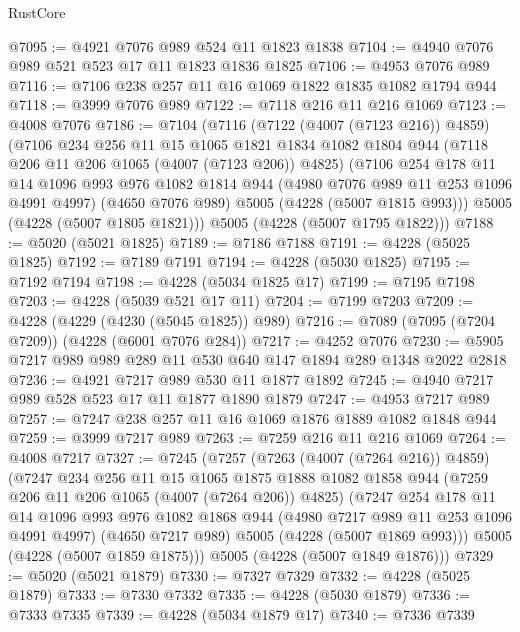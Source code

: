 \begin{lexlean}{RustCore}
\begin{coremodule}
@7095 := @4921 @7076 @989 @524 @11 @1823 @1838
@7104 := @4940 @7076 @989 @521 @523 @17 @11 @1823 @1836 @1825
@7106 := @4953 @7076 @989
@7116 := @7106 @238 @257 @11 @16 @1069 @1822 @1835 @1082 @1794 @944
@7118 := @3999 @7076 @989
@7122 := @7118 @216 @11 @216 @1069
@7123 := @4008 @7076
@7186 := @7104
    (@7116
      (@7122 (@4007 (@7123 @216)) @4859)
      (@7106
        @234
        @256
        @11
        @15
        @1065
        @1821
        @1834
        @1082
        @1804
        @944
        (@7118 @206 @11 @206 @1065 (@4007 (@7123 @206)) @4825)
        (@7106
          @254
          @178
          @11
          @14
          @1096
          @993
          @976
          @1082
          @1814
          @944
          (@4980 @7076 @989 @11 @253 @1096 @4991 @4997)
          (@4650 @7076 @989)
          @5005
          (@4228 (@5007 @1815 @993)))
        @5005
        (@4228 (@5007 @1805 @1821)))
      @5005
      (@4228 (@5007 @1795 @1822)))
@7188 := @5020 (@5021 @1825)
@7189 := @7186 @7188
@7191 := @4228 (@5025 @1825)
@7192 := @7189 @7191
@7194 := @4228 (@5030 @1825)
@7195 := @7192 @7194
@7198 := @4228 (@5034 @1825 @17)
@7199 := @7195 @7198
@7203 := @4228 (@5039 @521 @17 @11)
@7204 := @7199 @7203
@7209 := @4228 (@4229 (@4230 (@5045 @1825)) @989)
@7216 := @7089 (@7095 (@7204 @7209)) (@4228 (@6001 @7076 @284))
@7217 := @4252 @7076
@7230 := @5905 @7217 @989 @989 @289 @11 @530 @640 @147 @1894 @289 @1348 @2022 @2818
@7236 := @4921 @7217 @989 @530 @11 @1877 @1892
@7245 := @4940 @7217 @989 @528 @523 @17 @11 @1877 @1890 @1879
@7247 := @4953 @7217 @989
@7257 := @7247 @238 @257 @11 @16 @1069 @1876 @1889 @1082 @1848 @944
@7259 := @3999 @7217 @989
@7263 := @7259 @216 @11 @216 @1069
@7264 := @4008 @7217
@7327 := @7245
    (@7257
      (@7263 (@4007 (@7264 @216)) @4859)
      (@7247
        @234
        @256
        @11
        @15
        @1065
        @1875
        @1888
        @1082
        @1858
        @944
        (@7259 @206 @11 @206 @1065 (@4007 (@7264 @206)) @4825)
        (@7247
          @254
          @178
          @11
          @14
          @1096
          @993
          @976
          @1082
          @1868
          @944
          (@4980 @7217 @989 @11 @253 @1096 @4991 @4997)
          (@4650 @7217 @989)
          @5005
          (@4228 (@5007 @1869 @993)))
        @5005
        (@4228 (@5007 @1859 @1875)))
      @5005
      (@4228 (@5007 @1849 @1876)))
@7329 := @5020 (@5021 @1879)
@7330 := @7327 @7329
@7332 := @4228 (@5025 @1879)
@7333 := @7330 @7332
@7335 := @4228 (@5030 @1879)
@7336 := @7333 @7335
@7339 := @4228 (@5034 @1879 @17)
@7340 := @7336 @7339

\end{coremodule}
\end{lexlean}
